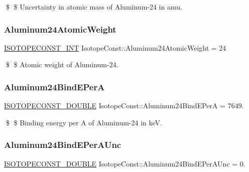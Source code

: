 \$ \$ Uncertainty in atomic mass of Aluminum-\/24 in amu. \mbox{\label{group___isotope_const-_aluminum-_al24_gab7752d2a60514c9108b22b97e7379624}} 
\subsubsection{\texorpdfstring{Aluminum24\+Atomic\+Weight}{Aluminum24AtomicWeight}}
{\footnotesize\ttfamily \mbox{\hyperlink{group___isotope_const-_macros_ga5f18360b3e99483a35c32d789e62621c}{I\+S\+O\+T\+O\+P\+E\+C\+O\+N\+S\+T\+\_\+\+I\+NT}} Isotope\+Const\+::\+Aluminum24\+Atomic\+Weight = 24}

\$ \$ Atomic weight of Aluminum-\/24. \mbox{\label{group___isotope_const-_aluminum-_al24_gaa10c9022199938eeff68fc99c31e6b08}} 
\subsubsection{\texorpdfstring{Aluminum24\+Bind\+E\+PerA}{Aluminum24BindEPerA}}
{\footnotesize\ttfamily \mbox{\hyperlink{group___isotope_const-_macros_ga8f45a7272ce02c0b4c65c44636ed719a}{I\+S\+O\+T\+O\+P\+E\+C\+O\+N\+S\+T\+\_\+\+D\+O\+U\+B\+LE}} Isotope\+Const\+::\+Aluminum24\+Bind\+E\+PerA = 7649.}

\$ \$ Binding energy per A of Aluminum-\/24 in keV. \mbox{\label{group___isotope_const-_aluminum-_al24_ga897d3946e8622f4e8276c0bb9daeccd8}} 
\subsubsection{\texorpdfstring{Aluminum24\+Bind\+E\+Per\+A\+Unc}{Aluminum24BindEPerAUnc}}
{\footnotesize\ttfamily \mbox{\hyperlink{group___isotope_const-_macros_ga8f45a7272ce02c0b4c65c44636ed719a}{I\+S\+O\+T\+O\+P\+E\+C\+O\+N\+S\+T\+\_\+\+D\+O\+U\+B\+LE}} Isotope\+Const\+::\+Aluminum24\+Bind\+E\+Per\+A\+Unc = 0.}

